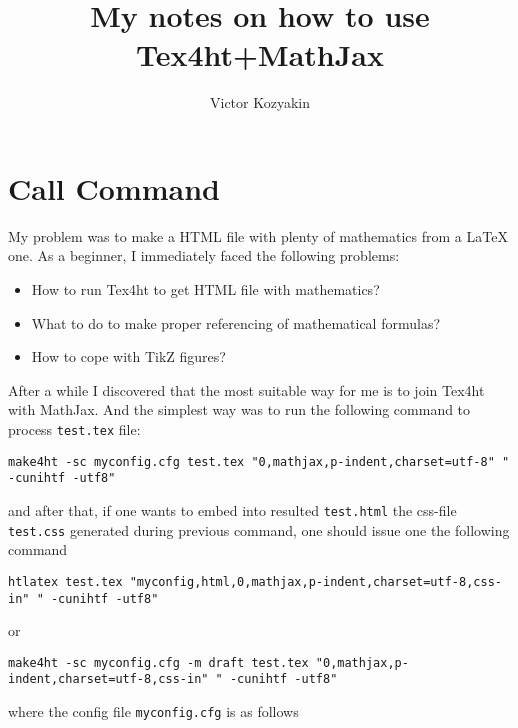 \documentclass{article}
\title{My notes on how to use Tex4ht+MathJax}
\author{Victor Kozyakin}
\begin{document}
\maketitle

\section{Call Command}\label{S1}
My problem was to make a HTML file with plenty of mathematics from a \LaTeX{}
one. As a beginner, I immediately faced the following problems:
\begin{itemize}
\item How to run Tex4ht to get HTML file with mathematics?
\item What to do to make proper referencing of mathematical formulas?
\item How to cope with TikZ figures?
\end{itemize}

After a while I discovered that the most suitable way for me is to join
Tex4ht with MathJax. And the simplest way was to run the following command to
process \verb|test.tex| file:

{\small
\begin{verbatim}
make4ht -sc myconfig.cfg test.tex "0,mathjax,p-indent,charset=utf-8" " -cunihtf -utf8"
\end{verbatim}}
\noindent and after that, if one wants to embed into resulted
\verb|test.html| the css-file \verb|test.css| generated during previous
command, one should issue one the following command {\small
\begin{verbatim}
htlatex test.tex "myconfig,html,0,mathjax,p-indent,charset=utf-8,css-in" " -cunihtf -utf8"
\end{verbatim}
\noindent or
\begin{verbatim}
make4ht -sc myconfig.cfg -m draft test.tex "0,mathjax,p-indent,charset=utf-8,css-in" " -cunihtf -utf8"
\end{verbatim}}
\noindent where the config file \verb|myconfig.cfg| is as
follows
\end{document}
